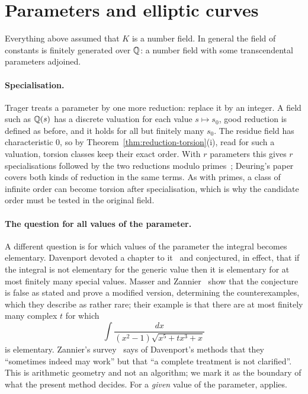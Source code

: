 \section{Parameters and elliptic curves}\label{sec:fo-parameters}

Everything above assumed that $K$ is a number field. In general the field of
constants is finitely generated over $\mathbb{Q}$: a number field with some
transcendental parameters adjoined.

\paragraph{Specialisation.} Trager treats a parameter by one more reduction:
replace it by an integer. A field such as $\mathbb{Q}(s)$ has a discrete valuation
for each value $s \mapsto s_0$, good reduction is defined as before, and it
holds for all but finitely many $s_0$. The residue field has characteristic
$0$, so by Theorem~\ref{thm:reduction-torsion}(i), read for such a valuation,
torsion classes keep their exact order. With $r$ parameters this gives $r$
specialisations followed by the two reductions modulo
primes~\cite[\S6.3]{trager1984}; Deuring's paper~\cite{deuring1941} covers
both kinds of reduction in the same terms. As with primes, a class of
infinite order can become torsion after specialisation, which is why the
candidate order must be tested in the original field.

\paragraph{The question for all values of the parameter.} A different
question is for which values of the parameter the integral becomes
elementary. Davenport devoted a chapter to it~\cite[Chapter~6]{davenport1981}
and conjectured, in effect, that if the integral is not elementary for the
generic value then it is elementary for at most finitely many special
values. Masser and Zannier~\cite{masser2020} show that the conjecture is
false as stated and prove a modified version, determining the
counterexamples, which they describe as rather rare; their example is that
there are at most finitely many complex $t$ for which
\[
  \int \frac{dx}{(x^2 - 1) \sqrt{x^5 + t x^3 + x}}
\]
is elementary. Zannier's survey~\cite{zannier2014} says of Davenport's
methods that they ``sometimes indeed may work'' but that ``a complete
treatment is not clarified''. This is arithmetic geometry and not an
algorithm; we mark it as the boundary of what the present method decides. For
a \emph{given} value of the parameter,  applies.

